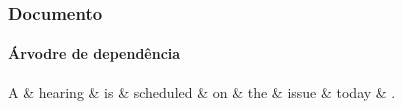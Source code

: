\begin{frame}[fragile]
\frametitle{Documento}
\framesubtitle{Árvodre de dependência}
 
  \begin{fmpage}{\textwidth}
   \begin{dependency}[theme = simple]
   \begin{deptext}[column sep=1em]
      A \& hearing \& is \& scheduled \& on \& the \& issue \& today \& . \\
   \end{deptext}
   \end{dependency}
  \end{fmpage}

\end{frame}
